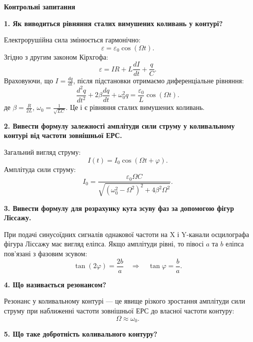 \documentclass[12pt, a4paper]{article}
\begin{document}
    \newpage

    \begin{center}
        \textbf{\Large Контрольні запитання}
    \end{center}

    \textbf{1. Як виводиться рівняння сталих вимушених коливань у контурі?}

    Електрорушійна сила змінюється гармонічно:
    \[
    \varepsilon = \varepsilon_0 \cos(\Omega t).
    \]
    Згідно з другим законом Кірхгофа:
    \[
    \varepsilon = IR + L\frac{dI}{dt} + \frac{q}{C}.
    \]
    Враховуючи, що $\displaystyle I = \frac{dq}{dt}$, після підстановки отримаємо диференціальне рівняння:
    \[
    \frac{d^2q}{dt^2} + 2\beta \frac{dq}{dt} + \omega_0^2 q = \frac{\varepsilon_0}{L} \cos(\Omega t).
    \]
    де $\displaystyle \beta = \frac{R}{2L}$, $\displaystyle \omega_0 = \frac{1}{\sqrt{LC}}$. Це і є рівняння сталих вимушених коливань.

    \vspace{1em}

    \textbf{2. Вивести формулу залежності амплітуди сили струму у коливальному контурі від частоти зовнішньої ЕРС.}

    Загальний вигляд струму:
    \[
    I(t) = I_0 \cos(\Omega t + \varphi).
    \]
    Амплітуда сили струму:
    \[
    I_0 = \frac{\varepsilon_0 \Omega C}{\sqrt{(\omega_0^2 - \Omega^2)^2 + 4\beta^2 \Omega^2}}.
    \]

    \vspace{1em}

    \textbf{3. Вивести формулу для розрахунку кута зсуву фаз за допомогою фігур Ліссажу.}

    При подачі синусоїдних сигналів однакової частоти на X і Y-канали осцилографа фігура Ліссажу має вигляд еліпса. Якщо амплітуди рівні, то півосі \( a \) та \( b \) еліпса пов’язані з фазовим зсувом:
    \[
    \tan(2\varphi) = \frac{2b}{a} \quad \Rightarrow \quad \tan\varphi = \frac{b}{a}.
    \]

    \vspace{1em}

    \textbf{4. Що називається резонансом?}

    Резонанс у коливальному контурі — це явище різкого зростання амплітуди сили струму при наближенні частоти зовнішньої ЕРС до власної частоти контуру:
    \[
    \Omega \approx \omega_0.
    \]

    \vspace{1em}

    \textbf{5. Що таке добротність коливального контуру?}
\end{document}
